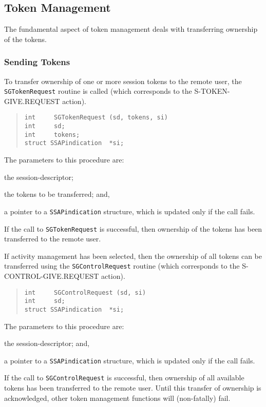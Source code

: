 \subsection	{Token Management}
The fundamental aspect of token management deals with transferring ownership
of the tokens.

\subsubsection	{Sending Tokens}
To transfer ownership of one or more session tokens to the remote
user,
the \verb"SGTokenRequest" routine is called
(which corresponds to the {\sf S-TOKEN-GIVE.REQUEST\/} action).
\begin{quote}\small\begin{verbatim}
int     SGTokenRequest (sd, tokens, si)
int     sd;
int     tokens;
struct SSAPindication  *si;
\end{verbatim}\end{quote}
The parameters to this procedure are:
\begin{describe}
\item[\verb"sd":] the session-descriptor;

\item[\verb"tokens":] the tokens to be transferred;
and,

\item[\verb"si":] a pointer to a \verb"SSAPindication" structure, which is
updated only if the call fails.
\end{describe}
If the call to \verb"SGTokenRequest" is successful,
then ownership of the tokens has been transferred to the remote user.

If activity management has been selected,
then the ownership of all tokens can be transferred using the
\verb"SGControlRequest" routine
(which corresponds to the {\sf S-CONTROL-GIVE.REQUEST\/} action).
\begin{quote}\small\begin{verbatim}
int     SGControlRequest (sd, si)
int     sd;
struct SSAPindication  *si;
\end{verbatim}\end{quote}
The parameters to this procedure are:
\begin{describe}
\item[\verb"sd":] the session-descriptor;
and,

\item[\verb"si":] a pointer to a \verb"SSAPindication" structure, which is
updated only if the call fails.
\end{describe}
If the call to \verb"SGControlRequest" is successful,
then ownership of all available tokens has been transferred to the remote user.
Until this transfer of ownership is acknowledged,
other token management functions will (non-fatally) fail.

